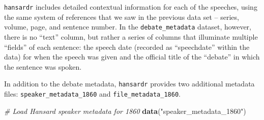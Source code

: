 \documentclass[
]{article}
\newenvironment{Shaded}{\begin{snugshade}}{\end{snugshade}}
\newcommand{\CommentTok}[1]{\textcolor[rgb]{0.56,0.35,0.01}{\textit{#1}}}
\newcommand{\FunctionTok}[1]{\textcolor[rgb]{0.13,0.29,0.53}{\textbf{#1}}}
\newcommand{\NormalTok}[1]{#1}
\newcommand{\StringTok}[1]{\textcolor[rgb]{0.31,0.60,0.02}{#1}}
\begin{document}
\begin{table}
\centering
\caption{\label{tab:unnamed-chunk-5}Debate-level metadata from 1860s Hansard, including each sentence's identifier, the date of the speech, and the title of the corresponding debate.}
\centering
{}
\end{table}

\texttt{hansardr} includes detailed contextual information for each of
the speeches, using the same system of references that we saw in the
previous data set -- series, volume, page, and sentence number. In the
\texttt{debate\_metadata} dataset, however, there is no ``text'' column,
but rather a series of columns that illuminate multiple ``fields'' of
each sentence: the speech date (recorded as ``speechdate'' within the
data) for when the speech was given and the official title of the
``debate'' in which the sentence was spoken.

In addition to the debate metadata, \texttt{hansardr} provides two
additional metadata files: \texttt{speaker\_metadata\_1860} and
\texttt{file\_metadata\_1860}.

\begin{Shaded}
\begin{Highlighting}[]
\CommentTok{\# Load Hansard speaker metadata for 1860 }
\FunctionTok{data}\NormalTok{(}\StringTok{"speaker\_metadata\_1860"}\NormalTok{)}
\end{Highlighting}
\end{Shaded}
\end{document}
